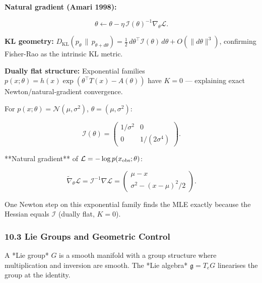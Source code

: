 \documentclass[11pt,a4paper]{article}
\begin{document}
\textbf{Natural gradient (Amari 1998):}

\[\theta \leftarrow \theta - \eta\,\mathcal{I}(\theta)^{-1}\nabla_\theta\mathcal{L}.\]

\textbf{KL geometry:} \(D_{\mathrm{KL}}(p_\theta\,\|\,p_{\theta+d\theta}) = \tfrac12\,d\theta^\top\mathcal{I}(\theta)\,d\theta + O(\|d\theta\|^3)\), confirming Fisher-Rao as the intrinsic KL metric.

\textbf{Dually flat structure:} Exponential families \(p(x;\theta)=h(x)\exp(\theta^\top T(x)-A(\theta))\) have \(K=0\) --- explaining exact Newton/natural-gradient convergence.

\begin{tcolorbox}[colback=notebg!60,colframe=optgreen,fonttitle=\bfseries\sffamily,title={\textsf{\textbf{Example}} — Example — Natural Gradient on a Gaussian Model},breakable]
For $p(x;\theta) = \mathcal{N}(\mu, \sigma^2)$, $\theta=(\mu,\sigma^2)$:

$$\mathcal{I}(\theta) = \begin{pmatrix} 1/\sigma^2 & 0 \\ 0 & 1/(2\sigma^4) \end{pmatrix}.$$

**Natural gradient** of $\mathcal{L} = -\log p(x_{\rm obs};\theta)$:

$$\tilde\nabla_\theta\mathcal{L} = \mathcal{I}^{-1}\nabla\mathcal{L} = \begin{pmatrix}\mu-x \\ \sigma^2 - (x-\mu)^2/2\end{pmatrix}.$$

One Newton step on this exponential family finds the MLE exactly because the
Hessian equals $\mathcal{I}$ (dually flat, $K=0$).
\end{tcolorbox}

\subsubsection{10.3 Lie Groups and Geometric Control}\label{lie-groups-and-geometric-control}

\begin{tcolorbox}[colback=defbg!60,colframe=optblue,fonttitle=\bfseries\sffamily,title={\textsf{\textbf{Definition}} — Definition — Lie Group},breakable]
A *Lie group* $G$ is a smooth manifold with a group structure where
multiplication and inversion are smooth.  The *Lie algebra* $\mathfrak{g} = T_e G$
linearises the group at the identity.
\end{tcolorbox}
\end{document}

